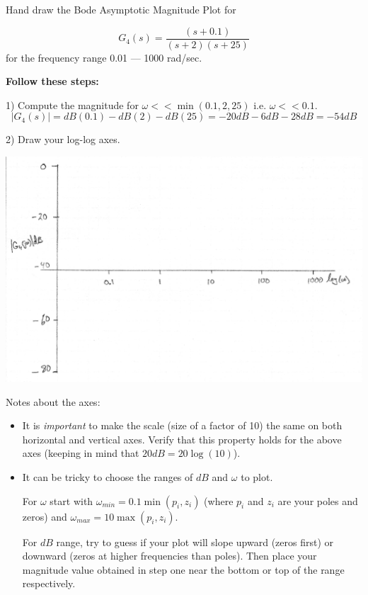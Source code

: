 \begin{Example}\label{firstBodeMagexample}
Hand draw the Bode Asymptotic Magnitude Plot for

\[
G_4(s) = \frac  {(s+0.1)}  {(s+2)(s+25)}
\]
for the frequency range 0.01 --- 1000 rad/sec.

{\bf Follow these steps:}

1) Compute the magnitude for $\omega << \min(0.1, 2, 25)$ i.e. $\omega << 0.1$.
\[
|G_4(s)| = dB(0.1) - dB(2) - dB(25) = -20dB - 6dB - 28dB = -54dB
\]

2) Draw your log-log axes.

\includegraphics[width=6.5in]{figs05/00737a.png}

Notes about the axes:
\begin{itemize}
  \item It is {\it important } to make the scale (size of a factor of 10)
  the same on both horizontal and vertical axes.
  Verify that this property holds for the above axes (keeping in mind that $20dB = 20\log(10)$).

  \item It can be tricky to choose the ranges of $dB$ and $\omega$ to plot.

  For $\omega$ start with $\omega_{min} = 0.1 \min(p_i, z_i)$ (where $p_i$ and $z_i$ are your poles and zeros) and $\omega_{max} = 10 \max(p_i,z_i)$.

  For $dB$ range, try to guess if your plot will slope upward (zeros first) or downward (zeros at higher frequencies than poles).  Then place your magnitude value obtained in step one near the bottom or top of the range respectively.
\end{itemize}


\end{Example}



